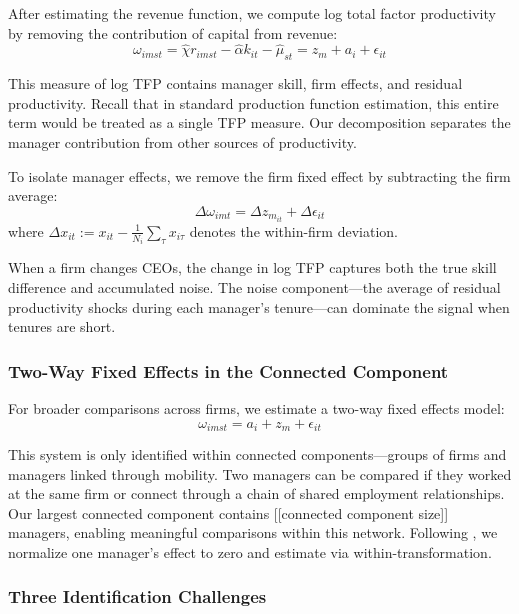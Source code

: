 \documentclass[11pt,a4paper]{article}
\begin{document}
After estimating the revenue function, we compute log total factor productivity by removing the contribution of capital from revenue:
\begin{equation}
\omega_{imst} = \hat{\chi} r_{imst} - \hat{\alpha} k_{it} - \hat{\mu}_{st} = z_m + a_i + \epsilon_{it}
\end{equation}

This measure of log TFP contains manager skill, firm effects, and residual productivity. Recall that in standard production function estimation, this entire term would be treated as a single TFP measure. Our decomposition separates the manager contribution from other sources of productivity.

To isolate manager effects, we remove the firm fixed effect by subtracting the firm average:
\begin{equation}
\Delta\omega_{imt} = \Delta z_{m_{it}} + \Delta\epsilon_{it}
\end{equation}
where $\Delta x_{it} := x_{it} - \frac{1}{N_i}\sum_{\tau} x_{i\tau}$ denotes the within-firm deviation.

When a firm changes CEOs, the change in log TFP captures both the true skill difference and accumulated noise. The noise component—the average of residual productivity shocks during each manager's tenure—can dominate the signal when tenures are short.

\subsubsection{Two-Way Fixed Effects in the Connected Component}

For broader comparisons across firms, we estimate a two-way fixed effects model:
\begin{equation}
\omega_{imst} = a_i + z_m + \epsilon_{it}
\end{equation}

This system is only identified within connected components—groups of firms and managers linked through mobility. Two managers can be compared if they worked at the same firm or connect through a chain of shared employment relationships. Our largest connected component contains [[connected component size]] managers, enabling meaningful comparisons within this network. Following \citet{Abowd1999Econometrica}, we normalize one manager's effect to zero and estimate via within-transformation.

\subsubsection{Three Identification Challenges}
\end{document}
